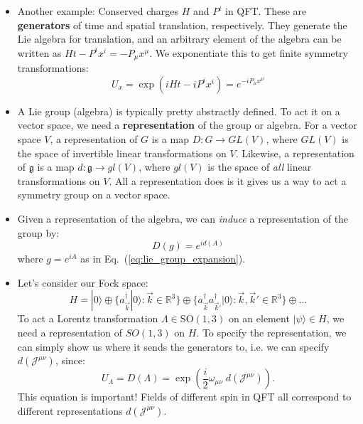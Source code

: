 \documentclass[12pt, oneside]{article}   	%
\theoremstyle{definition}
\begin{document}
\begin{itemize}
	\item Another example: Conserved charges $H$ and $P^i$ in QFT. These are \textbf{generators} of time and spatial translation, respectively. They generate the Lie algebra for translation, and an arbitrary element of the algebra can be written as $Ht - P^i x^i = - P_\mu x^\mu$. We exponentiate this to get finite symmetry transformations:
	\begin{equation}
		U_x = \exp\left(iHt - i P^i x^i \right) = e^{-iP_\mu x^\mu}
	\end{equation}
	
	\item A Lie group (algebra) is typically pretty abstractly defined. To act it on a vector space, we need a \textbf{representation} of the group or algebra. For a vector space $V$, a representation of $G$ is a map $D : G\rightarrow GL(V)$, where $GL(V)$ is the space of invertible linear transformations on $V$. Likewise, a representation of $\mathfrak g$ is a map $d : \mathfrak g\rightarrow gl(V)$, where $gl(V)$ is the space of \textit{all} linear transformations on $V$. All a representation does is it gives us a way to act a symmetry group on a vector space. 
	
	\item Given a representation of the algebra, we can \textit{induce} a representation of the group by:
	\begin{equation}
		D(g) = e^{i d(A)}
	\end{equation}
	where $g = e^{iA}$ as in Eq.~(\ref{eq:lie_group_expansion}). 
	
	\item Let's consider our Fock space:
	\begin{equation}
		H = |0\rangle\oplus \{a_{\vec k}^\dagger |0\rangle : \vec k\in\mathbb{R}^3\}\oplus \{a_{\vec k}^\dagger a_{\vec k'}^\dagger |0\rangle : \vec k, \vec k'\in\mathbb R^3\} \oplus ...
	\end{equation}
	To act a Lorentz transformation $\Lambda\in\mathrm{SO}(1, 3)$ on an element $|\psi\rangle\in H$, we need a representation of $SO(1, 3)$ on $H$. To specify the representation, we can simply show us where it sends the generators to, i.e. we can specify $d(\mathcal J^{\mu\nu})$, since:
	\begin{equation}
		U_\Lambda = D(\Lambda) = \exp \left(\frac{i}{2} \omega_{\mu\nu}\; d(\mathcal J^{\mu\nu})\right).
	\end{equation}
	This equation is important! Fields of different spin in QFT all correspond to different representations $d(\mathcal J^{\mu\nu})$. 
	

\end{itemize}
\end{document}
